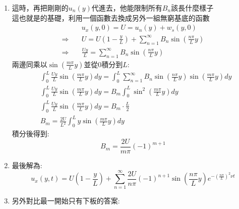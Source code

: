 \documentclass[../main.tex]{subfiles}
\begin{document}
\begin{itemize}
\begin{enumerate}
\begin{equation}
          \frac{n\pi}{L} y
        \right) e^{-\left(
          \frac{n\pi}{L}
        \right)^2 \nu t}
      \end{equation}
    \item 這時，再把剛剛的$u_n(y)$代進去，他能限制所有$B_n$該長什麼樣子\\
    這也就是的基礎，利用一個函數去換成另外一組無窮基底的函數
      \begin{align}
        & u_x(y,0) = U = u_n(y) + w_s(y,0) \nonumber\\
        \Rightarrow \quad & U = U\left(
          1 - \frac{y}{L}
        \right) + \sum_{n=1}^{\infty} B_n \sin\left(
          \frac{n\pi}{L} y
        \right) \nonumber\\
        \Rightarrow \quad & \frac{Uy}{L} = \sum_{n=1}^{\infty} B_n \sin\left(
          \frac{n\pi}{L} y
        \right)
      \end{align}
      兩邊同乘以$\sin\left(
        \frac{m\pi}{L} y
      \right)$並從0積分到$L$:
      \begin{align}
        & \int_0^L \frac{Uy}{L} \sin\left(
          \frac{m\pi}{L} y
        \right) dy = \int_0^L \sum_{n=1}^{\infty} B_n \sin\left(
          \frac{n\pi}{L} y
        \right) \sin\left(
          \frac{m\pi}{L} y
        \right) dy \nonumber\\
        & \int_0^L \frac{Uy}{L} \sin\left(
          \frac{m\pi}{L} y
        \right) dy = B_m \int_0^L  \sin^2\left(
          \frac{m\pi}{L} y
        \right) dy \nonumber\\
        & \int_0^L \frac{Uy}{L} \sin\left(
          \frac{m\pi}{L} y
        \right) dy = B_m \cdot \frac{L}{2} \nonumber\\
        & B_m = \frac{2U}{L^2} \int_0^L y \sin\left(
          \frac{m\pi}{L} y
        \right) dy 
      \end{align}
      積分後得到:
      \begin{equation}
        B_m = \frac{2U}{m\pi} (-1)^{m+1}
      \end{equation}
    \item 最後解為:
      \begin{equation}
        \boxed{u_x(y,t) = U \left(
          1 - \frac{y}{L}
        \right) + \sum_{n=1}^{\infty} \frac{2U}{n\pi} (-1)^{n+1} \sin\left(
          \frac{n\pi}{L} y
        \right) e^{-\left(
          \frac{n\pi}{L}
        \right)^2 \nu t}}
      \end{equation}
    \item 另外對比最一開始只有下板的答案:

\end{enumerate}
\end{itemize}
\end{document}

